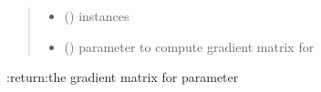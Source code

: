 \documentclass[letterpaper,10pt,english]{sphinxmanual}
\begin{document}
\begin{fulllineitems}
\begin{fulllineitems}
\begin{quote}
\begin{description}
\begin{itemize}
\item {} 
 (\sphinxstyleliteralemphasis{, }\sphinxstyleliteralemphasis{(}\sphinxstyleliteralemphasis{(}\sphinxstyleliteralemphasis{, }\sphinxstyleliteralemphasis{)}\sphinxstyleliteralemphasis{)}) \textendash{} instances

\item {} 
 () \textendash{} parameter to compute gradient matrix for

\end{itemize}

\end{description}\end{quote}

:return:the gradient matrix for parameter 

\end{fulllineitems}


\end{fulllineitems}

\end{document}
